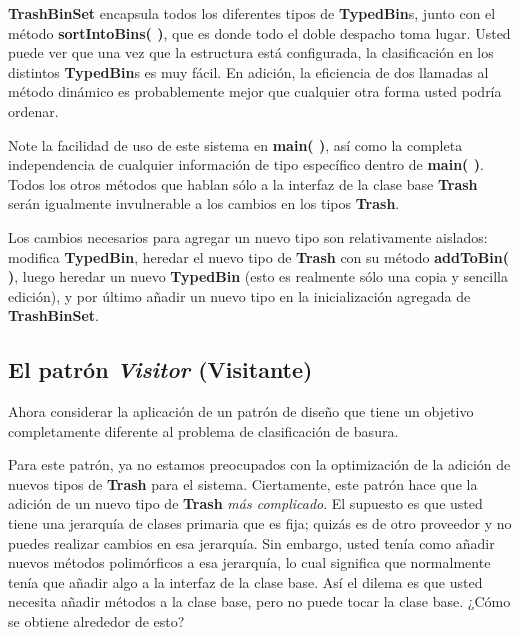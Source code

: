 \textbf{TrashBinSet} encapsula todos los diferentes tipos de \textbf{ TypedBin}s, junto con el método \textbf{sortIntoBins( )}, que es donde todo el doble
despacho toma lugar. Usted puede ver que una vez que la estructura está configurada, la clasificación en los distintos \textbf{TypedBin}s es muy fácil. En adición, la eficiencia de dos llamadas al método dinámico es probablemente mejor que cualquier otra forma usted podría ordenar. \newline

Note la facilidad de uso de este sistema en \textbf{main( )}, así como la completa independencia de cualquier información de tipo específico dentro de \textbf{main( )}. Todos los otros métodos que hablan sólo a la interfaz de la clase base \textbf{Trash} serán igualmente invulnerable a los cambios en los tipos \textbf{Trash}.         \newline

Los cambios necesarios  para agregar un nuevo tipo son relativamente aislados: modifica \textbf{TypedBin}, heredar el nuevo tipo de \textbf{Trash} con su método \textbf{addToBin( )}, luego heredar un nuevo \textbf{TypedBin} (esto es realmente sólo una copia y sencilla edición), y por último añadir un nuevo tipo en la inicialización agregada de \textbf{TrashBinSet}.  \newline

\subsection*{El patrón \textit{Visitor} (Visitante)}
\label{subsec:epV}

Ahora considerar la aplicación de un patrón de diseño que tiene un objetivo completamente diferente al problema de clasificación de basura. \newline

Para este patrón, ya no estamos preocupados con la optimización de la adición de nuevos tipos de \textbf{Trash} para el sistema. Ciertamente, este patrón hace que la adición de un nuevo tipo de \textbf{Trash} \textit{más complicado}. El supuesto es que usted tiene una jerarquía de clases primaria que es fija; quizás es de otro proveedor y no puedes realizar cambios en esa jerarquía. Sin embargo, usted tenía como añadir nuevos métodos polimórficos a esa jerarquía, lo cual significa que normalmente tenía que añadir algo a la interfaz de la clase base. Así el dilema es que usted necesita añadir métodos a la clase base, pero no puede tocar la clase base. ¿Cómo se obtiene alrededor de esto?  \newline

